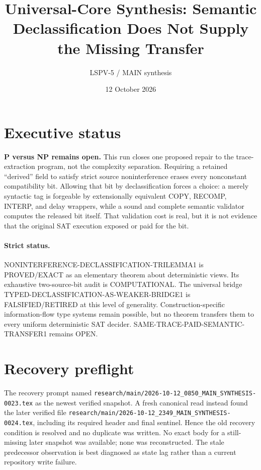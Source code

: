 \documentclass[11pt]{article}
\title{Universal-Core Synthesis: Semantic Declassification Does Not Supply the Missing Transfer}
\author{LSPV-5 / MAIN synthesis}
\date{12 October 2026}
\newcommand{\OPEN}{\textsf{OPEN}}
\newcommand{\EXACT}{\textsf{PROVED/EXACT}}
\newcommand{\COMP}{\textsf{COMPUTATIONAL}}
\newcommand{\RET}{\textsf{FALSIFIED/RETIRED}}
\begin{document}
\sloppy
\maketitle

\section*{Executive status}
\textbf{P versus NP remains open.}  This run closes one proposed repair to the
trace-extraction program, not the complexity separation.  Requiring a retained
``derived'' field to satisfy strict source noninterference erases every
nonconstant compatibility bit.  Allowing that bit by declassification forces a
choice: a merely syntactic tag is forgeable by extensionally equivalent COPY,
RECOMP, INTERP, and delay wrappers, while a sound and complete semantic
validator computes the released bit itself.  That validation cost is real, but
it is not evidence that the original SAT execution exposed or paid for the
bit.

\paragraph{Strict status.}
\textsf{NONINTERFERENCE-DECLASSIFICATION-TRILEMMA1} is \EXACT{} as an
elementary theorem about deterministic views.  Its exhaustive two-source-bit
audit is \COMP{}.  The universal bridge
\textsf{TYPED-DECLASSIFICATION-AS-WEAKER-BRIDGE1} is \RET{} at this level of
generality.  Construction-specific information-flow type systems remain
possible, but no theorem transfers them to every uniform deterministic SAT
decider.  \textsf{SAME-TRACE-PAID-SEMANTIC-TRANSFER1} remains \OPEN{}.

\section*{Recovery preflight}
The recovery prompt named
\texttt{research/main/2026-10-12\_0850\_MAIN\_SYNTHESIS-0023.tex} as the
newest verified snapshot.  A fresh canonical read instead found the later
verified file
\texttt{research/main/2026-10-12\_2349\_MAIN\_SYNTHESIS-0024.tex}, including
its required header and final sentinel.  Hence the old recovery condition is
resolved and no duplicate was written.  No exact body for a still-missing
later snapshot was available; none was reconstructed.  The stale predecessor
observation is best diagnosed as state lag rather than a current repository
write failure.
\end{document}
